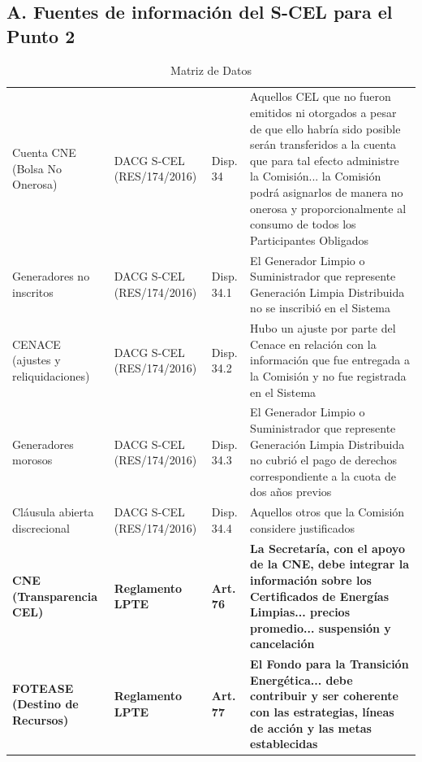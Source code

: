 \documentclass{cel}
\begin{document}
\vspace{0.4cm}
\subsection{A. Fuentes de información del S-CEL para el Punto 2}
\nopagebreak

\vspace{0.3cm}
\begin{tabladoradoLargo}
\renewcommand{\tabularxcolumn}[1]{p{#1}}
\begin{xltabular}{\textwidth}{|X|X|X|X|}
\caption{Matriz de Datos} \\
\toprule
{}  &  &  &  \\
\midrule
\endhead
Cuenta CNE (Bolsa No Onerosa) & DACG S-CEL (RES/174/2016) & Disp. 34 & \textquotedbl{}Aquellos CEL que no fueron emitidos ni otorgados a pesar de que ello habría sido posible serán transferidos a la cuenta que para tal efecto administre la Comisión... la Comisión podrá asignarlos de manera no onerosa y proporcionalmente al consumo de todos los Participantes Obligados\textquotedbl{} \\ \hline
Generadores no inscritos & DACG S-CEL (RES/174/2016) & Disp. 34.1 & \textquotedbl{}El Generador Limpio o Suministrador que represente Generación Limpia Distribuida no se inscribió en el Sistema\textquotedbl{} \\ \hline
CENACE (ajustes y reliquidaciones) & DACG S-CEL (RES/174/2016) & Disp. 34.2 & \textquotedbl{}Hubo un ajuste por parte del Cenace en relación con la información que fue entregada a la Comisión y no fue registrada en el Sistema\textquotedbl{} \\ \hline
Generadores morosos & DACG S-CEL (RES/174/2016) & Disp. 34.3 & \textquotedbl{}El Generador Limpio o Suministrador que represente Generación Limpia Distribuida no cubrió el pago de derechos correspondiente a la cuota de dos años previos\textquotedbl{} \\ \hline
Cláusula abierta discrecional & DACG S-CEL (RES/174/2016) & Disp. 34.4 & \textquotedbl{}Aquellos otros que la Comisión considere justificados\textquotedbl{} \\ \hline
\textbf{CNE (Transparencia CEL)} & \textbf{Reglamento LPTE} & \textbf{Art. 76} & \textbf{\textquotedbl{}La Secretaría, con el apoyo de la CNE, debe integrar la información sobre los Certificados de Energías Limpias... precios promedio... suspensión y cancelación\textquotedbl{}} \\ \hline
\textbf{FOTEASE (Destino de Recursos)} & \textbf{Reglamento LPTE} & \textbf{Art. 77} & \textbf{\textquotedbl{}El Fondo para la Transición Energética... debe contribuir y ser coherente con las estrategias, líneas de acción y las metas establecidas\textquotedbl{}} \\ \hline
\bottomrule
\end{xltabular}
\end{tabladoradoLargo}
\end{document}
